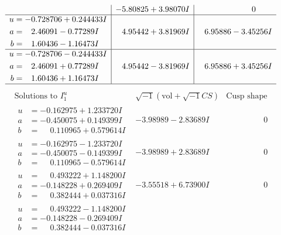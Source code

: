 \documentclass[1p]{elsarticle_modified}
\theoremstyle{definition}
\newcommand{\I}{\sqrt{-1}}
\begin{document}
$$\begin{array}{c|c|c}
 & -5.80825 + 3.98070 I & \phantom{-0.000000 } 0 \\ \hline\begin{aligned}
u &= -0.728706 + 0.244433 I \\
a &= \phantom{-}2.46091 - 0.77289 I \\
b &= \phantom{-}1.60436 - 1.16473 I\end{aligned}
 & \phantom{-}4.95442 + 3.81969 I & \phantom{-}6.95886 - 3.45256 I \\ \hline\begin{aligned}
u &= -0.728706 - 0.244433 I \\
a &= \phantom{-}2.46091 + 0.77289 I \\
b &= \phantom{-}1.60436 + 1.16473 I\end{aligned}
 & \phantom{-}4.95442 - 3.81969 I & \phantom{-}6.95886 + 3.45256 I\\
 \hline 
 \end{array}$$\newpage$$\begin{array}{c|c|c}  
\text{Solutions to }I^u_{1}& \I (\text{vol} + \sqrt{-1}CS) & \text{Cusp shape}\\
 \hline 
\begin{aligned}
u &= -0.162975 + 1.233720 I \\
a &= -0.450075 + 0.149399 I \\
b &= \phantom{-}0.110965 + 0.579614 I\end{aligned}
 & -3.98989 - 2.83689 I & \phantom{-0.000000 } 0 \\ \hline\begin{aligned}
u &= -0.162975 - 1.233720 I \\
a &= -0.450075 - 0.149399 I \\
b &= \phantom{-}0.110965 - 0.579614 I\end{aligned}
 & -3.98989 + 2.83689 I & \phantom{-0.000000 } 0 \\ \hline\begin{aligned}
u &= \phantom{-}0.493222 + 1.148200 I \\
a &= -0.148228 + 0.269409 I \\
b &= \phantom{-}0.382444 + 0.037316 I\end{aligned}
 & -3.55518 + 6.73900 I & \phantom{-0.000000 } 0 \\ \hline\begin{aligned}
u &= \phantom{-}0.493222 - 1.148200 I \\
a &= -0.148228 - 0.269409 I \\
b &= \phantom{-}0.382444 - 0.037316 I\end{aligned}

\end{array}$$
\end{document}
